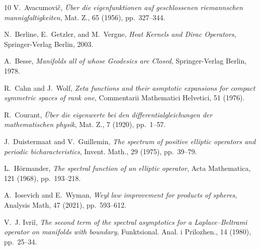 \documentclass[11pt,lettersize,reqno,fullpage]{amsart}
\begin{document}
\begin{thebibliography}{10}
{\sc V.~Avacumovi\v{c}}, {\em \"{U}ber die eigenfunktionen auf geschlossenen
  riemannschen mannigfaltigkeiten}, Mat. Z., 65 (1956), pp.~327--344.

{\sc N.~Berline, E.~Getzler, and M.~Vergne}, {\em Heat Kernels and Dirac
  Operators}, Springer-Verlag Berlin, 2003.

{\sc A.~Besse}, {\em Manifolds all of whose Geodesics are Closed}, 
Springer-Verlag Berlin, 1978. 

{\sc R.~Cahn and J.~Wolf}, {\em Zeta functions and their asmptotic expansions
  for compact symmetric spaces of rank one}, Commentarii Mathematici Helvetici,
  51 (1976).

{\sc R.~Courant}, {\em \"{U}ber die eigenwerte bei den differentialgleichungen
  der mathematischen physik}, Mat. Z., 7 (1920), pp.~1--57.

{\sc J.~Duistermaat and V.~Guillemin}, {\em The spectrum of positive elliptic
  operators and periodic bicharacteristics}, Invent. Math., 29 (1975),
  pp.~39--79.

{\sc L.~H\"{o}rmander}, {\em The spectral function of an elliptic operator},
  Acta Mathematica, 121 (1968), pp.~193--218.

{\sc A.~Iosevich and E.~Wyman}, {\em Weyl law improvement for products of
  spheres}, Analysis Math, 47 (2021), pp.~593--612.

{\sc V.~J. Ivri\v{i}}, {\em The second term of the spectral asymptotics for a
  {L}aplace–{B}eltrami operator on manifolds with boundary}, Funktsional.
  Anal. i Prilozhen., 14 (1980), pp.~25--34.

\end{thebibliography}
\end{document}
